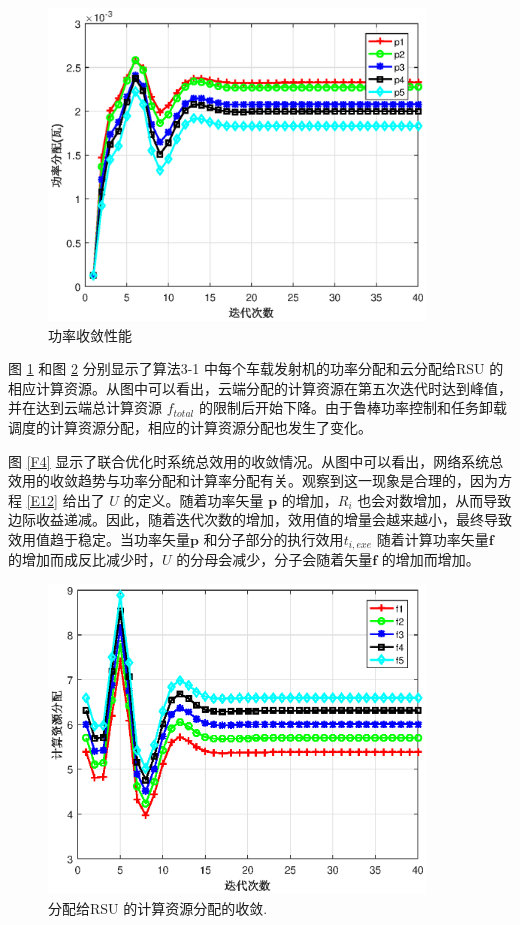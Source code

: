 \begin{figure}[H]
\centering
\includegraphics[width=10cm]{figures//chap3//pp.eps}
\caption{功率收敛性能}
\label{F2}
\end{figure}

图 \ref{F2} 和图 \ref{F3} 分别显示了算法3-1 中每个车载发射机的功率分配和云分配给RSU 的相应计算资源。从图中可以看出，云端分配的计算资源在第五次迭代时达到峰值，
并在达到云端总计算资源 $f_{total}$ 的限制后开始下降。由于鲁棒功率控制和任务卸载调度的计算资源分配，相应的计算资源分配也发生了变化。

图 \ref{F4} 显示了联合优化时系统总效用的收敛情况。从图中可以看出，网络系统总效用的收敛趋势与功率分配和计算率分配有关。观察到这一现象是合理的，因为方程 \eqref{E12} 给出了 $U$ 的定义。随着功率矢量 $\mathbf{p}$ 的增加，$R_i$ 也会对数增加，从而导致边际收益递减。因此，随着迭代次数的增加，效用值的增量会越来越小，最终导致效用值趋于稳定。当功率矢量$\mathbf{p}$ 和分子部分的执行效用$t_{i,exe}$ 随着计算功率矢量$\mathbf{f}$ 的增加而成反比减少时，$U$ 的分母会减少，分子会随着矢量$\mathbf{f}$ 的增加而增加。
\begin{figure}[H]
\centering
\includegraphics[width=10cm]{figures//chap3//ff.eps}
\caption{分配给RSU 的计算资源分配的收敛.}
\label{F3}
\end{figure}

